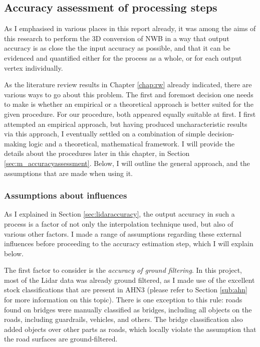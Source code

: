 \subsection{Accuracy assessment of processing steps}
\label{sub:accuracyoverview}

As I emphasised in various places in this report already, it was among the aims of this research to perform the 3D conversion of NWB in a way that output accuracy is as close the the input accuracy as possible, and that it can be evidenced and quantified either for the process as a whole, or for each output vertex individually.

As the literature review results in Chapter \ref{chap:rw} already indicated, there are various ways to go about this problem. The first and foremost decision one needs to make is whether an empirical or a theoretical approach is better suited for the given procedure. For our procedure, both appeared equally suitable at first. I first attempted an empirical approach, but having produced uncharacteristic results via this approach, I eventually settled on a combination of simple decision-making logic and a theoretical, mathematical framework. I will provide the details about the procedures later in this chapter, in Section \ref{sec:m_accuracyassessment}. Below, I will outline the general approach, and the assumptions that are made when using it.

\subsubsection{Assumptions about influences}

As I explained in Section \ref{sec:lidaraccuracy}, the output accuracy in such a process is a factor of not only the interpolation technique used, but also of various other factors. I made a range of assumptions regarding these external influences before proceeding to the accuracy estimation step, which I will explain below.

The first factor to consider is the \textit{accuracy of ground filtering}. In this project, most of the Lidar data was already ground filtered, as I made use of the excellent stock classifications that are present in AHN3 (please refer to Section \ref{sub:ahn} for more information on this topic). There is one exception to this rule: roads found on bridges were manually classified as bridges, including all objects on the roads, including guardrails, vehicles, and others. The bridge classification also added objects over other parts as roads, which locally violate the assumption that the road surfaces are ground-filtered.

